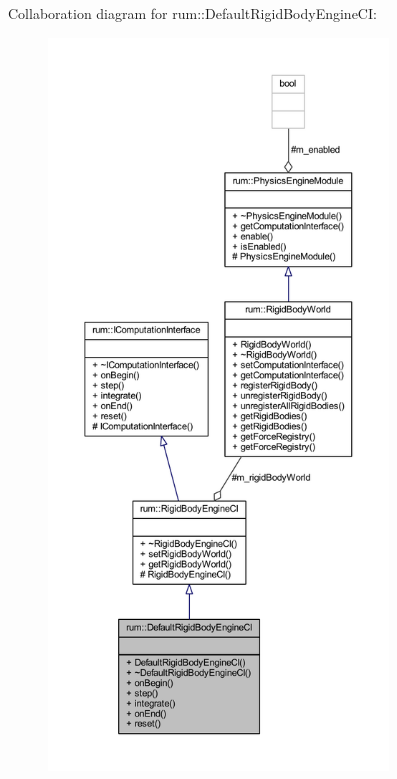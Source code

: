 Collaboration diagram for rum\+:\+:Default\+Rigid\+Body\+Engine\+CI\+:\nopagebreak
\begin{figure}[H]
\begin{center}
\leavevmode
\includegraphics[height=550pt]{classrum_1_1_default_rigid_body_engine_c_i__coll__graph}
\end{center}
\end{figure}
